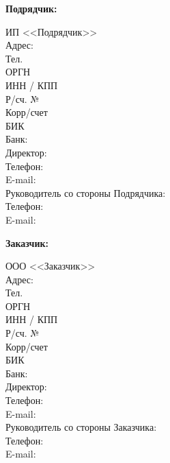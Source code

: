 \documentclass[a4paper, fontsize=12bp]{article}
\begin{document}
\noindent
\begin{minipage}{0.5\textwidth}
\begin{flushleft}
\begin{center}
\textbf{Подрядчик:}\\
\end{center}
ИП <<Подрядчик>> \\
Адрес:\\
Тел.\\
ОРГН\\
ИНН / КПП\\
Р/сч. №\\
Корр/счет\\
БИК\\
Банк:\\
\vspace{\baselineskip}
Директор:\\
Телефон:\\
E-mail:\\
\vspace{\baselineskip}
Руководитель со стороны Подрядчика:\\
Телефон:\\
E-mail:\\
\end{flushleft}
\end{minipage}
\begin{minipage}{0.5\textwidth}
\begin{flushleft}
\begin{center}
\textbf{Заказчик:}\\
\end{center}
ООО <<Заказчик>>\\
Адрес:\\
Тел.\\
ОРГН\\
ИНН / КПП\\
Р/сч. №\\
Корр/счет\\
БИК\\
Банк:\\
\vspace{\baselineskip}
Директор:\\
Телефон:\\
E-mail:\\
\vspace{\baselineskip}
Руководитель со стороны Заказчика:\\
Телефон:\\
E-mail:\\

\end{flushleft}
\end{minipage}
\end{document}
